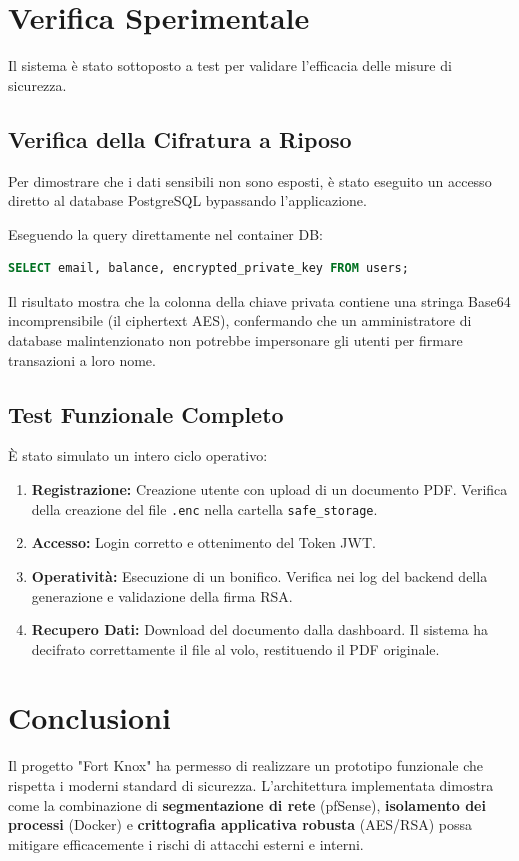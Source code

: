 \documentclass[a4paper, 12pt, titlepage]{article}
\begin{document}
\section{Verifica Sperimentale}
Il sistema è stato sottoposto a test per validare l'efficacia delle misure di sicurezza.

\subsection{Verifica della Cifratura a Riposo}
Per dimostrare che i dati sensibili non sono esposti, è stato eseguito un accesso diretto al database PostgreSQL bypassando l'applicazione.

Eseguendo la query direttamente nel container DB:
\begin{lstlisting}[language=SQL]
SELECT email, balance, encrypted_private_key FROM users;
\end{lstlisting}

Il risultato mostra che la colonna della chiave privata contiene una stringa Base64 incomprensibile (il ciphertext AES), confermando che un amministratore di database malintenzionato non potrebbe impersonare gli utenti per firmare transazioni a loro nome.

\subsection{Test Funzionale Completo}
È stato simulato un intero ciclo operativo:
\begin{enumerate}
    \item \textbf{Registrazione:} Creazione utente con upload di un documento PDF. Verifica della creazione del file \texttt{.enc} nella cartella \texttt{safe\_storage}.
    \item \textbf{Accesso:} Login corretto e ottenimento del Token JWT.
    \item \textbf{Operatività:} Esecuzione di un bonifico. Verifica nei log del backend della generazione e validazione della firma RSA.
    \item \textbf{Recupero Dati:} Download del documento dalla dashboard. Il sistema ha decifrato correttamente il file al volo, restituendo il PDF originale.
\end{enumerate}

\section{Conclusioni}
Il progetto "Fort Knox" ha permesso di realizzare un prototipo funzionale che rispetta i moderni standard di sicurezza. L'architettura implementata dimostra come la combinazione di \textbf{segmentazione di rete} (pfSense), \textbf{isolamento dei processi} (Docker) e \textbf{crittografia applicativa robusta} (AES/RSA) possa mitigare efficacemente i rischi di attacchi esterni e interni.
\end{document}
